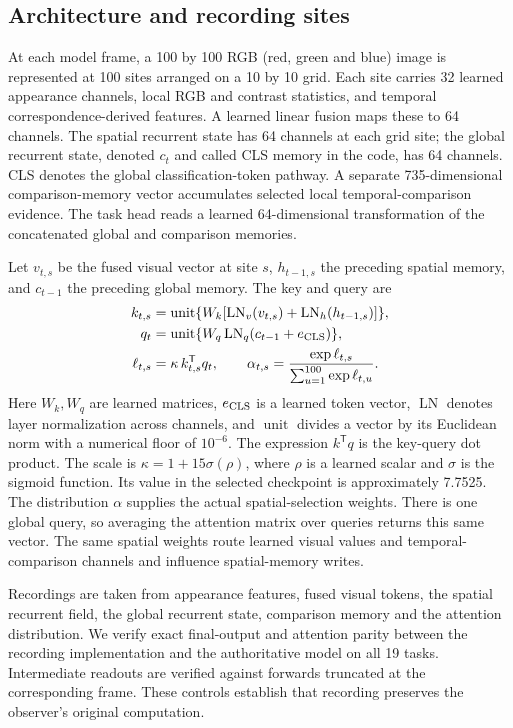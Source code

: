 \documentclass[11pt]{article}
\begin{document}
\subsection{Architecture and recording sites}
At each model frame, a 100 by 100 RGB (red, green and blue) image is represented at 100 sites arranged on a 10 by 10 grid. Each site carries 32 learned appearance channels, local RGB and contrast statistics, and temporal correspondence-derived features. A learned linear fusion maps these to 64 channels. The spatial recurrent state has 64 channels at each grid site; the global recurrent state, denoted $c_t$ and called CLS memory in the code, has 64 channels. CLS denotes the global classification-token pathway. A separate 735-dimensional comparison-memory vector accumulates selected local temporal-comparison evidence. The task head reads a learned 64-dimensional transformation of the concatenated global and comparison memories.

Let $v_{t,s}$ be the fused visual vector at site $s$, $h_{t-1,s}$ the preceding spatial memory, and $c_{t-1}$ the preceding global memory. The key and query are
\begin{align}
 k_{t,s}&=\operatorname{unit}\{W_k[\operatorname{LN}_v(v_{t,s})+\operatorname{LN}_h(h_{t-1,s})]\},\\
 q_t&=\operatorname{unit}\{W_q\operatorname{LN}_q(c_{t-1}+e_{\rm CLS})\},\\
 \ell_{t,s}&=\kappa\,k_{t,s}^{\mathsf T}q_t,\qquad
 \alpha_{t,s}=\frac{\exp\ell_{t,s}}{\sum_{u=1}^{100}\exp\ell_{t,u}}.
\end{align}
Here $W_k,W_q$ are learned matrices, $e_{\rm CLS}$ is a learned token vector, $\operatorname{LN}$ denotes layer normalization across channels, and $\operatorname{unit}$ divides a vector by its Euclidean norm with a numerical floor of $10^{-6}$. The expression $k^{\mathsf T}q$ is the key-query dot product. The scale is $\kappa=1+15\sigma(\rho)$, where $\rho$ is a learned scalar and $\sigma$ is the sigmoid function. Its value in the selected checkpoint is approximately 7.7525. The distribution $\alpha$ supplies the actual spatial-selection weights. There is one global query, so averaging the attention matrix over queries returns this same vector. The same spatial weights route learned visual values and temporal-comparison channels and influence spatial-memory writes.

Recordings are taken from appearance features, fused visual tokens, the spatial recurrent field, the global recurrent state, comparison memory and the attention distribution. We verify exact final-output and attention parity between the recording implementation and the authoritative model on all 19 tasks. Intermediate readouts are verified against forwards truncated at the corresponding frame. These controls establish that recording preserves the observer's original computation.
\end{document}
